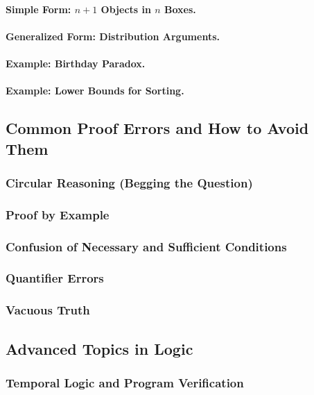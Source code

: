 \paragraph{Simple Form: $n+1$ Objects in $n$ Boxes.}
\paragraph{Generalized Form: Distribution Arguments.}
\paragraph{Example: Birthday Paradox.}
\paragraph{Example: Lower Bounds for Sorting.}

\subsection{Common Proof Errors and How to Avoid Them}
\label{subsec:proof-errors}

\subsubsection{Circular Reasoning (Begging the Question)}
\subsubsection{Proof by Example}
\subsubsection{Confusion of Necessary and Sufficient Conditions}
\subsubsection{Quantifier Errors}
\subsubsection{Vacuous Truth}

\subsection{Advanced Topics in Logic}
\label{subsec:advanced-logic}

\subsubsection{Temporal Logic and Program Verification}
